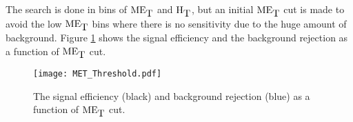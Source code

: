 The search is done in bins of $\mbox{ME}_{\mbox{T}}$ and $\mbox{H}_{\mbox{T}}$, but an initial $\mbox{ME}_{\mbox{T}}$ cut is
made to avoid the low $\mbox{ME}_{\mbox{T}}$ bins where there is no sensitivity due to the huge
amount of background. Figure \ref{fig:met_threshold} shows the signal efficiency
and the background rejection as a function of $\mbox{ME}_{\mbox{T}}$ cut.

\begin{figure}
\begin{center}
\texttt{[image: MET\_Threshold.pdf]}
\end{center}
\caption{The signal efficiency (black) and background rejection (blue) as a
function of $\mbox{ME}_{\mbox{T}}$ cut.}
\label{fig:met_threshold}
\end{figure}

